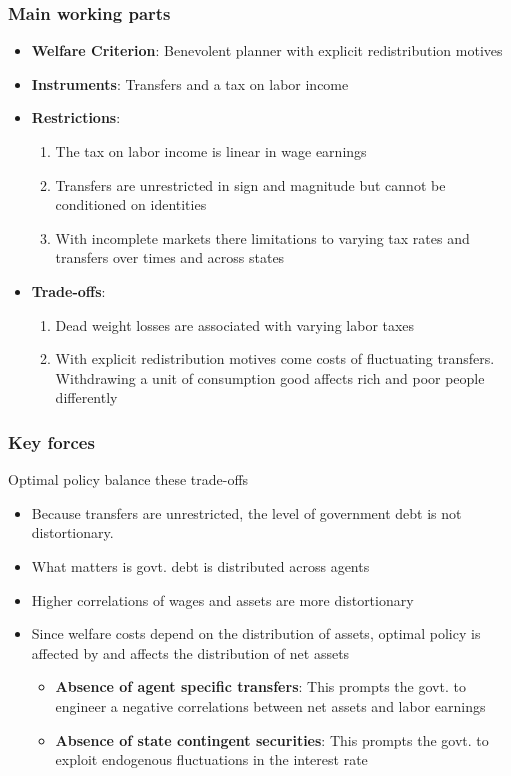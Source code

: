 \documentclass{beamer}
\begin{document}
\begin{frame}
 \frametitle{Main working parts}
\begin{itemize}
 \item \textbf{Welfare Criterion}: Benevolent planner with explicit redistribution motives
 \item \textbf{Instruments}: Transfers and a tax on labor income 
 \item \textbf{Restrictions}:
 \begin{enumerate}
  \item The tax on labor income is linear in wage earnings
  \item Transfers are unrestricted in sign and magnitude  but cannot be conditioned on identities
  \item With incomplete markets there limitations to varying tax rates and transfers over times and across states
 \end{enumerate}
\item \textbf{Trade-offs}:
\begin{enumerate}
\item Dead weight losses are associated with varying labor taxes
\item With  explicit redistribution motives come costs of fluctuating transfers. Withdrawing a unit of consumption good affects rich and poor people differently
\end{enumerate}
\end{itemize}
\end{frame}
\begin{frame}
 \frametitle{Key forces}
 Optimal policy balance these trade-offs
 \begin{itemize}
 \item Because transfers are unrestricted, the level of government debt is not distortionary.
 \item  What matters is govt. debt is distributed across agents
 \item Higher correlations of wages and assets are more distortionary
 \item Since welfare costs depend on the distribution of assets, optimal policy is affected by and affects the distribution of net assets
\begin{itemize}
\item \textbf{Absence of agent specific transfers}: This prompts the govt. to engineer  a negative correlations between net assets and labor earnings
\item \textbf{Absence of state contingent securities}: This prompts the govt. to exploit endogenous fluctuations in the interest rate
\end{itemize}

 \end{itemize}

\end{frame}
\end{document}
